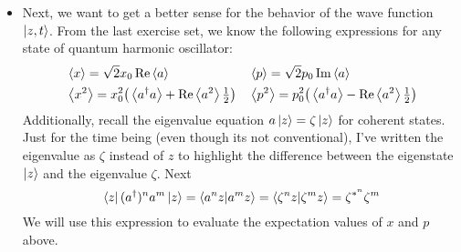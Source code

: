 \documentclass[11pt, a4paper]{article}
\begin{document}
\begin{itemize}
	\item Next, we want to get a better sense for the behavior of the wave function $ \ket{z, t} $. From the last exercise set, we know the following expressions for any state of quantum harmonic oscillator:
	\begin{align*}
		&\ev{x} = \sqrt{2}x_{0} \Re \ev{a} && \ev{p} = \sqrt{2} p_{0} \Im \ev{a}\\
		&\ev{x^{2}} = x_{0}^{2}\big(\ev{a^{\dagger}a} + \Re \ev{a^{2}} \tfrac{1}{2}\big) && \ev{p^{2}} = p_{0}^{2}\big(\ev{a^{\dagger}a} - \Re \ev{a^{2}} \tfrac{1}{2}\big)
	\end{align*}
	Additionally, recall the eigenvalue equation $ a \ket{z} = \zeta \ket{z} $ for coherent states. Just for the time being (even though its not conventional), I've written the eigenvalue as $ \zeta $ instead of $ z $ to highlight the difference between the eigenstate $ \ket{z} $ and the eigenvalue $ \zeta $. Next
	\begin{equation*}
		\bra{z}(a^{\dagger})^{n}a^{m}\ket{z} = \braket{a^{n}z}{a^{m}z} = \braket{\zeta^{n}z}{\zeta^{m}z} = \zeta^{*^{n}}\zeta^{m}
	\end{equation*}
	We will use this expression to evaluate the expectation values of $ x $ and $ p $ above. 
	

\end{itemize}
\end{document}
